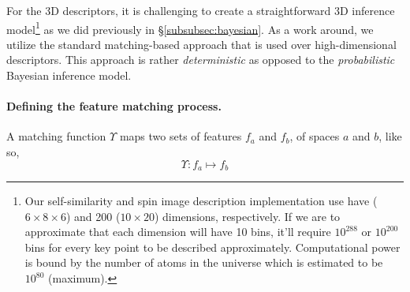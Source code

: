For the 3D descriptors, it is challenging to create a straightforward 3D inference model\footnote{Our self-similarity and spin image description implementation use have ($6\times 8 \times 6$) and 200 ($10 \times 20$) dimensions, respectively. If we are to approximate that each dimension will have 10 bins, it'll require $10^{288}$ or $10^{200}$ bins for every key point to be described approximately. Computational power is bound by the number of atoms in the universe which is estimated to be $10^{80}$ (maximum).} as we did previously in \S\ref{subsubsec:bayesian}. As a work around, we utilize the standard matching-based approach that is used over high-dimensional descriptors. This approach is rather \textit{deterministic} as opposed to the \textit{probabilistic} Bayesian inference model.

\paragraph{Defining the feature matching process.}
A matching function $\Upsilon$ maps two sets of features $f_a$ and $f_b$, of spaces $a$ and $b$, like so,
\begin{equation}
\Upsilon :f_a \mapsto f_b
\end{equation}

